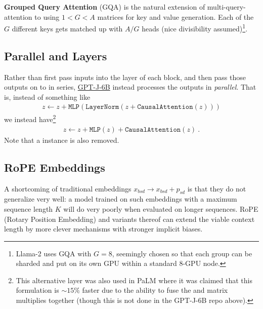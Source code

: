 \textbf{Grouped Query Attention} (GQA) \cite{ainslie2023gqa} is the natural extension of
multi-query-attention to using $ 1<G<A $ matrices for key and value generation. Each of the $G$
different keys gets matched up with $A/G$ heads (nice divisibility assumed)\footnote{Llama-2
    \cite{touvron2023llama2} uses GQA with $ G=8 $, seemingly chosen so that each group can be
sharded and put on its own GPU within a standard 8-GPU node.}.


\subsection{Parallel  and  Layers}

Rather than first pass inputs into the  layer of each block, and then pass
those outputs on to  in series, \href{https://github.com/kingoflolz/mesh-transformer-jax/blob/f8315e3003033b23f21d78361b288953064e0e76/mesh_transformer/layers.py#L303}{GPT-J-6B}
instead processes the  outputs in \textit{parallel}. That is, instead of something
like
\begin{align}
	z \leftarrow z + \texttt{MLP}\left ( \texttt{LayerNorm}\left ( z + \texttt{CausalAttention}\left ( z \right ) \right ) \right )
\end{align}
we instead have\footnote{This alternative layer was also used in PaLM \cite{chowdhery2022palm} where it
	was claimed that this formulation is $\sim 15\%$ faster due to the ability to fuse the 
	and  matrix multiplies together (though this is not done in the GPT-J-6B repo above).}
\begin{align}
	z \leftarrow z + \texttt{MLP}\left ( z \right )    + \texttt{CausalAttention}\left ( z \right )\ .
\end{align}
Note that a  instance is also removed.



\subsection{RoPE Embeddings}

A shortcoming of traditional embeddings $ x _{ bsd } \longrightarrow x _{ bsd } + p _{ sd } $ is
that they do not generalize very well: a model trained on such embeddings with a maximum sequence
length $ K $ will do very poorly when evaluated on longer sequences. RoPE (Rotary Position
Embedding) \cite{su2022roformer} and variants thereof can extend the viable context length by more
clever mechanisms with stronger implicit biases.

